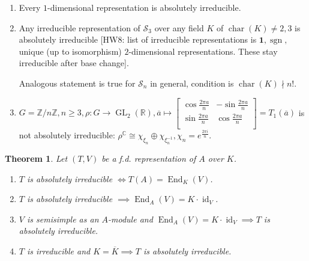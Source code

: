 \documentclass{article}
\theoremstyle{definition}
\theoremstyle{plain}
\newtheorem{theorem}{Theorem}[section]
\theoremstyle{remark}
\begin{document}
    \begin{enumerate}[label=\arabic*)]
        \item Every \(1\)-dimensional representation is absolutely irreducible.
        \item Any irreducible representation of \(\mathscr{S}_3\) over any field \(K\) of \(\operatorname{char}(K) \neq 2,3\) is absolutely irreducible [HW8: list of irreducible representations is \(\mathbf{1}, \operatorname{sgn},\) unique (up to isomorphism) \(2\)-dimensional representations. These stay irreducible after base change].
        
        Analogous statement is true for \(\mathscr{S}_n\) in general, condition is \(\operatorname{char}(K) \nmid n!\).
        \item \(G = \mathbb{Z} / n\mathbb{Z}, n \geq 3, \rho : G \to \operatorname{GL}_2(\mathbb{R}), \overline{a} \mapsto \begin{bmatrix}
            \cos \frac{2 \pi a}{n} & - \sin \frac{2 \pi a}{n} \\
            \sin \frac{2 \pi a}{n} & \cos \frac{2\pi a}{n}\\
        \end{bmatrix} = T_1(\overline{a})\) is not absolutely irreducible: \(\rho^\mathbb{C} \cong \chi_{\xi_n} \oplus \chi_{\xi_n ^{-1}}, \chi_n = e^{\frac{2\pi i}{n}}\).
    \end{enumerate} 

    \begin{theorem}
        Let \((T,V)\) be a f.d. representation of \(A\) over \(K\).

        \begin{enumerate}[label=\roman*)]
            \item \(T\) is absolutely irreducible \(\iff T(A) = \operatorname{End}_K(V)\).
            \item \(T\) is absolutely irreducible \(\implies \operatorname{End}_A(V) = K \cdot \operatorname{id}_{V}\).
            \item \(V\) is semisimple as an \(A\)-module and \(\operatorname{End}_A(V) = K \cdot \operatorname{id}_{V} \implies T\) is absolutely irreducible.
            \item \(T\) is irreducible and \(K = \overline{K} \implies T\) is absolutely irreducible.
        \end{enumerate} 
    \end{theorem}
\end{document}
